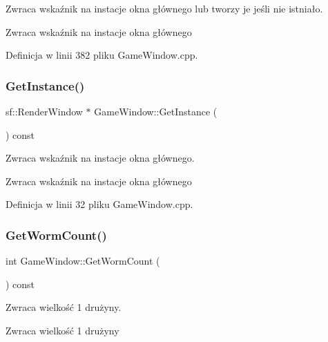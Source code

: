 Zwraca wskaźnik na instacje okna głównego lub tworzy je jeśli nie istniało. 

\begin{DoxyReturn}{Zwraca}
wskaźnik na instacje okna głównego 
\end{DoxyReturn}


Definicja w linii 382 pliku Game\+Window.\+cpp.

\mbox{\label{class_game_window_aa5ef8ededf54c333a5b19344b95220de}} 
\subsubsection{\texorpdfstring{Get\+Instance()}{GetInstance()}}
{\footnotesize\ttfamily sf\+::\+Render\+Window $\ast$ Game\+Window\+::\+Get\+Instance (\begin{DoxyParamCaption}{ }\end{DoxyParamCaption}) const}



Zwraca wskaźnik na instacje okna głównego. 

\begin{DoxyReturn}{Zwraca}
wskaźnik na instacje okna głównego 
\end{DoxyReturn}


Definicja w linii 32 pliku Game\+Window.\+cpp.

\mbox{\label{class_game_window_acfef11596afd262e0e4e77051ed24cde}} 
\subsubsection{\texorpdfstring{Get\+Worm\+Count()}{GetWormCount()}}
{\footnotesize\ttfamily int Game\+Window\+::\+Get\+Worm\+Count (\begin{DoxyParamCaption}{ }\end{DoxyParamCaption}) const}



Zwraca wielkość 1 drużyny. 

\begin{DoxyReturn}{Zwraca}
wielkość 1 drużyny 
\end{DoxyReturn}


